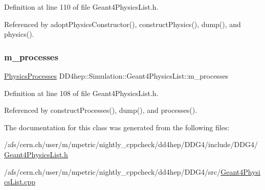 Definition at line 110 of file Geant4\+Physics\+List.\+h.



Referenced by adopt\+Physics\+Constructor(), construct\+Physics(), dump(), and physics().

\hypertarget{class_d_d4hep_1_1_simulation_1_1_geant4_physics_list_af3a8295fc76fdab16b92a9cff9b07b56}{}\label{class_d_d4hep_1_1_simulation_1_1_geant4_physics_list_af3a8295fc76fdab16b92a9cff9b07b56} 
\subsubsection{\texorpdfstring{m\+\_\+processes}{m\_processes}}
{\footnotesize\ttfamily \hyperlink{class_d_d4hep_1_1_simulation_1_1_geant4_physics_list_ab41e55687c9d57878fe2e6847a31f19a}{Physics\+Processes} D\+D4hep\+::\+Simulation\+::\+Geant4\+Physics\+List\+::m\+\_\+processes}



Definition at line 108 of file Geant4\+Physics\+List.\+h.



Referenced by construct\+Processes(), dump(), and processes().



The documentation for this class was generated from the following files\+:\begin{DoxyCompactItemize}
\item 
/afs/cern.\+ch/user/m/mpetric/nightly\+\_\+cppcheck/dd4hep/\+D\+D\+G4/include/\+D\+D\+G4/\hyperlink{_geant4_physics_list_8h}{Geant4\+Physics\+List.\+h}\item 
/afs/cern.\+ch/user/m/mpetric/nightly\+\_\+cppcheck/dd4hep/\+D\+D\+G4/src/\hyperlink{_geant4_physics_list_8cpp}{Geant4\+Physics\+List.\+cpp}\end{DoxyCompactItemize}
